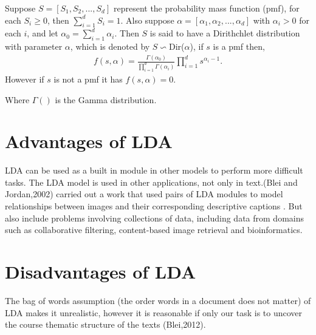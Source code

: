 Suppose $S=[S_1,S_2,...,S_d] $  represent the  probability mass function (pmf), for each $S_i\geq 0$, then $\sum _{i=1}^{d}S_i=1$. Also suppose $\alpha=[\alpha_1,\alpha_2,...,\alpha_d]$ with $\alpha_i>0$ for each $i$, and let $\alpha_0=\sum _{i=1}^{d}\alpha_i$. Then $S$ is said to have a Dirithchlet distribution with parameter $\alpha$, which is denoted by $S \backsim $Dir($\alpha$), if $s$ is a  pmf then,
\begin{align}
f(s,\alpha)=\frac{\Gamma(\alpha_0)}{\prod_{i=1}^{d}\Gamma(\alpha_i)}\prod_{i=1}^{d}s^{\alpha_i -1}.
\end{align}
However if $s$ is not a pmf  it has $f(s,\alpha)=0\text{.}$

Where $\Gamma()$ is the Gamma distribution.
\section{Advantages of LDA} 
LDA can be used as a built in module in other models to perform more difficult tasks.
The LDA model is used in other applications, not only in text.(Blei and Jordan,2002) carried out a  work that used pairs of LDA modules to
model relationships between images and their corresponding descriptive captions .
But also include problems involving collections of data, including data from domains such as collaborative filtering,
content-based image retrieval and bioinformatics.
\section{Disadvantages of LDA}
The bag of words assumption (the order words in a document does not matter) of LDA makes it unrealistic, however it is reasonable if only our task is to uncover the course thematic structure of the texts (Blei,2012).
